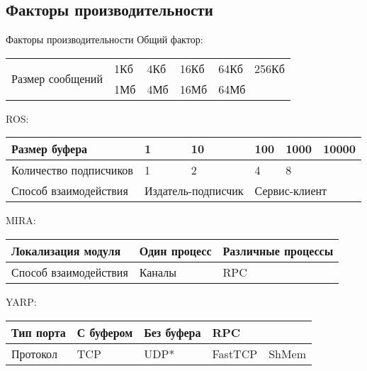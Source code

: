 \subsection{Факторы производительности}
\begin{frame}{Факторы производительности}
	Общий фактор: \vspace{-0.5em}
	\begin{table}[]
		\footnotesize
		\def\arraystretch{1.3}
		\begin{tabular}{|l|l|l|l|l|l|}
			\hline
			\multirow{2}{*}{Размер сообщений} & 1Кб & 4Кб & 16Кб & 64Кб        & 256Кб       \\ \cline{2-6} 
			& 1Мб & 4Мб & 16Мб & \multicolumn{2}{l|}{64Мб} \\ \hline
		\end{tabular}
	\end{table}
	ROS: \vspace{-1.5em}
	\begin{table}[]
		\footnotesize
		\def\arraystretch{1.3}
		\begin{tabular}{|l|l|l|l|l|l|}
			\hline
			Размер буфера          & 1                  & 10                 & 100   & 1000        & 10000        \\ \hline
			Количество подписчиков & 1                  & 2                  & 4     & \multicolumn{2}{l|}{8}     \\ \hline
			Способ взаимодействия  & \multicolumn{2}{l|}{Издатель-подписчик} & \multicolumn{3}{l|}{Сервис-клиент} \\ \hline
		\end{tabular}
	\end{table}
	MIRA: \vspace{-0.5em}
	\begin{table}[]
		\footnotesize
		\def\arraystretch{1.3}
		\begin{tabular}{|l|l|l|}
			\hline
			Локализация модуля    & Один процесс & Различные процессы \\ \hline
			Способ взаимодействия & Каналы       & RPC                \\ \hline
		\end{tabular}
	\end{table}
	YARP: \vspace{-0.5em}
	\begin{table}[]
		\footnotesize
		\def\arraystretch{1.3}
		\begin{tabular}{|l|l|l|l|l|}
			\hline
			Тип порта & С буфером & Без буфера                  & \multicolumn{2}{l|}{RPC} \\ \hline
			Протокол  & TCP       & UDP* & FastTCP      & ShMem     \\ \hline
		\end{tabular}
	\end{table}
\end{frame}
